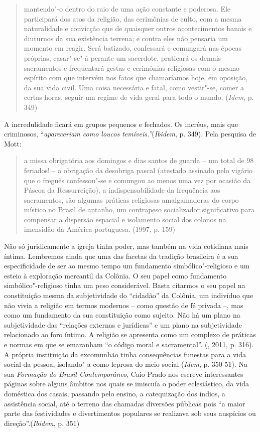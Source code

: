 \begin{quote}
mantendo"-o dentro do raio de uma ação constante e poderosa. Ele
participará dos atos da religião, das cerimônias de culto, com a mesma
naturalidade e convicção que de quaisquer outros acontecimentos banais e
diuturnos da sua existência terrena; e contra eles não pensaria um
momento em reagir. Será batizado, confessará e comungará nas épocas
próprias, casar"-se"-á perante um sacerdote, praticará os demais
sacramentos e frequentará gestas e cerimônias religiosas com o mesmo
espírito com que intervém nos fatos que chamaríamos hoje, em oposição,
da sua vida civil. Uma coisa necessária e fatal, como vestir"-se, comer a
certas horas, seguir um regime de vida geral para todo o mundo.
(\emph{Idem}, p. 349)
\end{quote}

A incredulidade ficará em grupos pequenos e fechados. Os incréus, mais
que criminosos, ``\emph{apareceriam como loucos
temíveis.''}(\emph{Ibidem}, p. 349). Pela pesquisa de Mott:

\begin{quote}
a missa obrigatória aos domingos e dias santos de guarda -- um total de
98 feriados! -- a obrigação da desobriga pascal (atestado assinado pelo
vigário que o freguês confessou"-se e comungou ao menos uma vez por
ocasião da Páscoa da Ressurreição), a indispensabilidade da frequência
aos sacramentos, são algumas práticas religiosas amalgamadoras do corpo
místico no Brasil de antanho, um contrapeso socializador significativo
para compensar a dispersão espacial e isolamento social dos colonos na
imensidão da América portuguesa. (1997, p. 159)
\end{quote}

Não só juridicamente a igreja tinha poder, mas também na vida cotidiana
mais íntima. Lembremos ainda que uma das facetas da tradição brasileira
é a sua especificidade de ser ao mesmo tempo um fundamento
simbólico"-religioso e um esteio à exploração mercantil da Colônia. O seu
papel como fundamento simbólico"-religioso tinha um peso considerável.
Basta citarmos o seu papel na constituição mesma da subjetividade do
``cidadão'' da Colônia, um indivíduo que não vivia a religião em termos
modernos -- como questão de fé privada --, mas como um fundamento da sua
constituição como sujeito. Não há um plano na subjetividade das
``relações externas e jurídicas'' e um plano na subjetividade
relacionado ao foro íntimo. A religião se apresenta como um complexo de
práticas e normas em que se emaranham ``o código moral e sacramental''.
(, 2011, p. 316). A própria instituição da excomunhão tinha
consequências funestas para a vida social da pessoa, isolando"-a como
leprosa do meio social (\emph{Idem}, p. 350-51). Na sua \emph{Formação
do Brasil Contemporâneo}, Caio Prado nos escreve interessantes páginas
sobre alguns âmbitos nos quais se imiscuía o poder eclesiástico, da vida
doméstica dos casais, passando pelo ensino, a catequização dos índios, a
assistência social, até o terreno das chamadas diversões públicas pois
``a maior parte das festividades e divertimentos populares se realizava
sob seus auspícios ou direção''.(\emph{Ibidem}, p. 351)

